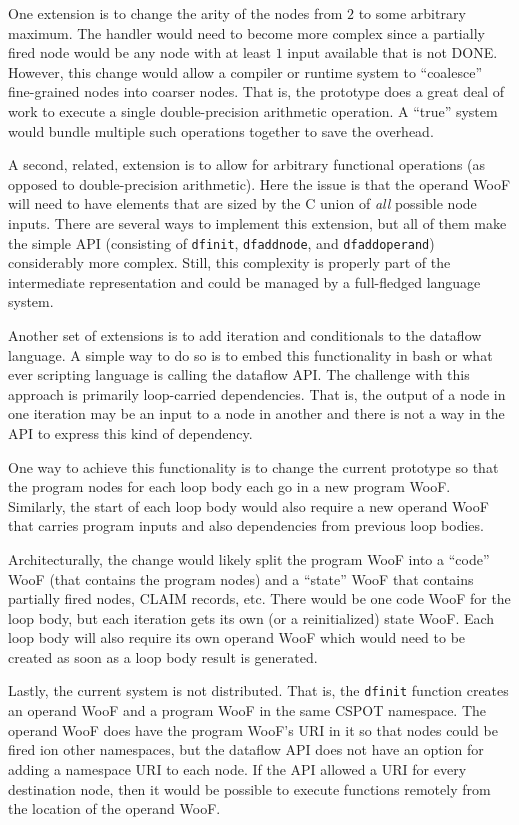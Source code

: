 \documentclass[10pt]{article}
\begin{document}
One extension is to change the arity of the nodes from $2$ to some arbitrary
maximum.  The handler would need to become more complex since a partially
fired node would be any node with at least $1$ input available that is not
DONE.  However, this change would allow a compiler or runtime system to
``coalesce'' fine-grained nodes into coarser nodes.  That is, the prototype
does a great deal of work to execute a single double-precision arithmetic
operation.  A ``true'' system would bundle multiple such operations together
to save the overhead.

A second, related, extension is to allow for arbitrary functional operations
(as opposed to double-precision arithmetic).  Here the issue is that the
operand WooF will need to have elements that are sized by the C union of
\textit{all} possible node inputs.  There are several ways to implement this
extension, but all of them make the simple API (consisting of \verb+dfinit+,
\verb+dfaddnode+, and \verb+dfaddoperand+) considerably more complex.  Still,
this complexity is properly part of the intermediate representation and could
be managed by a full-fledged language system.

Another set of extensions is to add iteration and conditionals to the dataflow
language.  A simple way to do so is to embed this functionality in bash or
what ever scripting language is calling the dataflow API.  The challenge with
this approach is primarily loop-carried dependencies.  That is, the output of
a node in one iteration may be an input to a node in another and there is not
a way in the API to express this kind of dependency.  

One way to achieve this functionality is to change the current prototype so
that the program nodes for each loop body each go in a new program WooF.
Similarly, the start of each loop body would also require a new operand WooF
that carries program inputs and also dependencies from previous loop bodies.   

Architecturally, the change would likely split the program WooF into a ``code''
WooF (that contains the program nodes) and a ``state'' WooF that contains
partially fired nodes, CLAIM records, etc.  There would be one code WooF for
the loop body, but each iteration gets its own (or a reinitialized) state
WooF.  Each loop body will also require its own operand WooF which would need
to be created as soon as a loop body result is generated.  

Lastly, the current system is not distributed.  That is, the \verb+dfinit+
function creates an operand WooF and a program WooF in the same CSPOT
namespace.  The operand WooF does have the program WooF's URI in it so that
nodes could be fired ion other namespaces, but the dataflow API does not have
an option for adding a namespace URI to each node.  If the API allowed a URI
for every destination node, then it would be possible to execute functions
remotely from the location of the operand WooF.
\end{document}
